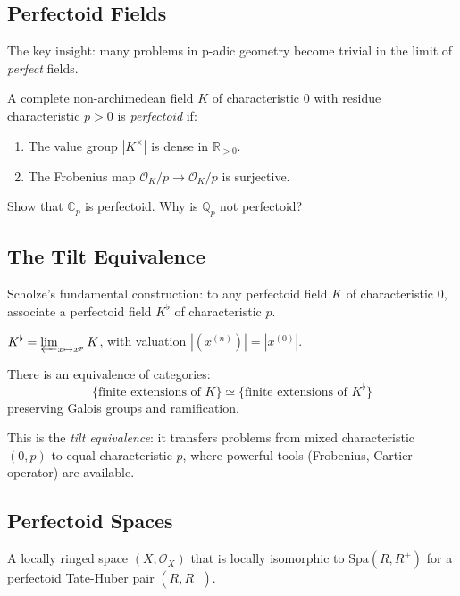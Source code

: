 \subsection{Perfectoid Fields}
The key insight: many problems in p-adic geometry become trivial in the limit of \emph{perfect} fields.

\begin{definition}
A complete non-archimedean field $K$ of characteristic $0$ with residue characteristic $p>0$ is \emph{perfectoid} if:
\begin{enumerate}
\item The value group $|K^\times|$ is dense in $\mathbb{R}_{>0}$.
\item The Frobenius map $\mathcal{O}_K/p \to \mathcal{O}_K/p$ is surjective.
\end{enumerate}
\end{definition}

\begin{exercise}[Basic]
Show that $\mathbb{C}_p$ is perfectoid. Why is $\mathbb{Q}_p$ not perfectoid?
\end{exercise}

\subsection{The Tilt Equivalence}
Scholze's fundamental construction: to any perfectoid field $K$ of characteristic $0$, associate a perfectoid field $K^\flat$ of characteristic $p$.

\begin{definition}[Tilt]
$K^\flat = \varprojlim_{x \mapsto x^p} K$, with valuation $|(x^{(n)})| = |x^{(0)}|$.
\end{definition}

\begin{theorem}
There is an equivalence of categories:
\[
\{\text{finite extensions of } K\} \simeq \{\text{finite extensions of } K^\flat\}
\]
preserving Galois groups and ramification.
\end{theorem}

This is the \emph{tilt equivalence}: it transfers problems from mixed characteristic $(0,p)$ to equal characteristic $p$, where powerful tools (Frobenius, Cartier operator) are available.

\subsection{Perfectoid Spaces}
\begin{definition}
A locally ringed space $(X, \mathcal{O}_X)$ that is locally isomorphic to $\text{Spa}(R, R^+)$ for a perfectoid Tate-Huber pair $(R, R^+)$.
\end{definition}


